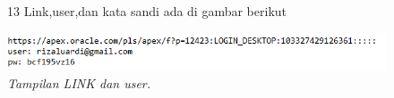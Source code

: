 \begin{enumerate}
\begin{figure}
\item[13] Link,user,dan kata sandi ada di gambar berikut
    \begin{center}
\includegraphics[scale=0.2]{figures/13.png}
    \caption{\textit{Tampilan LINK dan user.}}
        \end{center}
\label{gambar}
\end{figure}

    

\end{enumerate}
